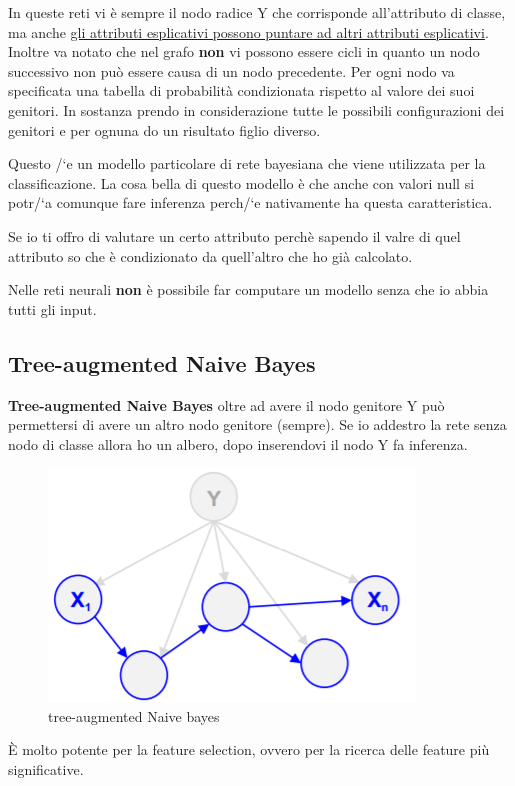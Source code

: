 \documentclass[12pt, a4paper,titlepage,openany]{article}
\begin{document}
In queste reti vi \`e sempre il nodo radice Y che corrisponde all'attributo di classe, ma anche \underline{gli attributi esplicativi possono puntare ad altri attributi esplicativi}. Inoltre va notato che nel grafo \textbf{non} vi possono essere cicli in quanto un nodo successivo non pu\`o essere causa di un nodo precedente. Per ogni nodo va specificata una tabella di probabilit\`a condizionata rispetto al valore dei suoi genitori. In sostanza prendo in considerazione tutte le possibili configurazioni dei genitori e per ognuna do un risultato figlio diverso.

Questo /`e un modello particolare di rete bayesiana che viene utilizzata per la classificazione. La cosa bella di questo modello \`e che anche con valori null si potr/`a comunque fare inferenza perch/`e nativamente ha questa caratteristica. 

Se io ti offro di valutare un certo attributo perch\`e sapendo il valre di quel attributo so che \`e condizionato da quell'altro che ho gi\`a calcolato.  

Nelle reti neurali \textbf{non} \`e possibile far computare un modello senza che io abbia tutti gli input. 

\subsection{Tree-augmented Naive Bayes}
\textbf{Tree-augmented Naive Bayes} oltre ad avere il nodo genitore Y pu\`o permettersi di avere un altro nodo genitore (sempre). Se io addestro la rete senza nodo di classe allora ho un albero, dopo inserendovi il nodo Y fa inferenza. 

\begin{figure}[h!]
	\centering
	\includegraphics[height=0.35 \linewidth]{pict/treenaivebayes.png}
	\caption{tree-augmented Naive bayes}
\end{figure}

\`E molto potente per la feature selection, ovvero per la ricerca delle feature pi\`u significative. 
\end{document}
